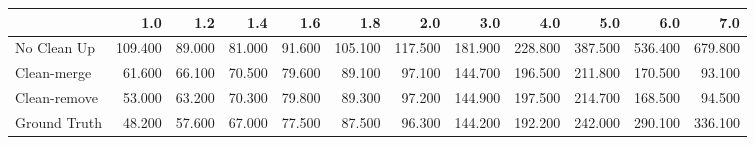 \begin{tabular}{lrrrrrrrrrrr}
\toprule
{} &     1.0 &    1.2 &    1.4 &    1.6 &     1.8 &     2.0 &     3.0 &     4.0 &     5.0 &     6.0 &     7.0 \\
\midrule
No Clean Up  & 109.400 & 89.000 & 81.000 & 91.600 & 105.100 & 117.500 & 181.900 & 228.800 & 387.500 & 536.400 & 679.800 \\
Clean-merge  &  61.600 & 66.100 & 70.500 & 79.600 &  89.100 &  97.100 & 144.700 & 196.500 & 211.800 & 170.500 &  93.100 \\
Clean-remove &  53.000 & 63.200 & 70.300 & 79.800 &  89.300 &  97.200 & 144.900 & 197.500 & 214.700 & 168.500 &  94.500 \\
Ground Truth &  48.200 & 57.600 & 67.000 & 77.500 &  87.500 &  96.300 & 144.200 & 192.200 & 242.000 & 290.100 & 336.100 \\
\bottomrule
\end{tabular}
